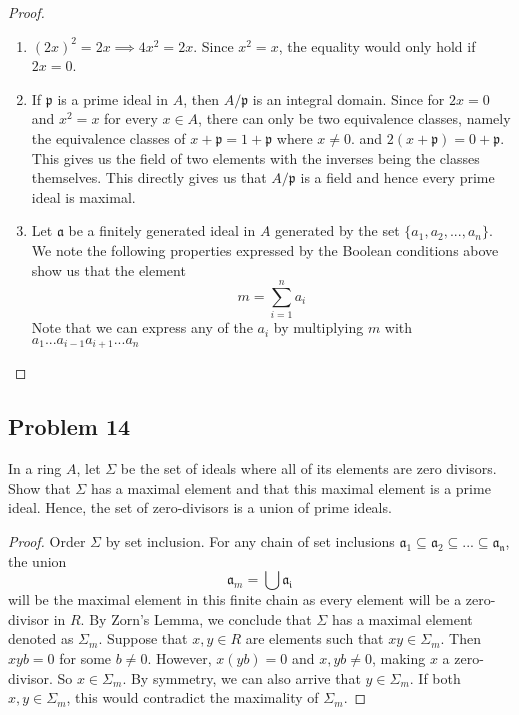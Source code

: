 \documentclass[12pt]{article}
\begin{document}
\begin{proof}
 \begin{enumerate}
  \item $(2x)^2 = 2x \implies 4x^2 = 2x$. Since $x^2 = x$, the equality would only hold if $2x = 0$.
  \item If $\mathfrak{p}$ is a prime ideal in $A$, then $A / \mathfrak{p}$ is an integral domain. Since for $2x = 0$ and $x^2 = x$ for every $x \in A$, there can only be two equivalence classes, namely the equivalence classes of $x + \mathfrak{p} = 1 + \mathfrak{p}$ where $x \neq 0$. and $2(x + \mathfrak{p})= 0 + \mathfrak{p}$. This gives us the field of two elements with the inverses being the classes themselves. This directly gives us that $A / \mathfrak{p}$ is a field and hence every prime ideal is maximal. 
  \item Let $\mathfrak{a}$ be a finitely generated ideal in $A$ generated by the set $\{a_1,a_2,...,a_n\}$. We note the following properties expressed by the Boolean conditions above show us that the element
  $$ m = \sum_{i=1}^n a_i $$ Note that we can express any of the $a_i$ by multiplying $m$ with $a_1...a_{i-1}a_{i+1}...a_n$

 \end{enumerate}

\end{proof}

\subsection{Problem 14}
In a ring $A$, let $\Sigma$ be the set of ideals where all of its elements are zero divisors. Show that $\Sigma$ has a maximal element and that this maximal element is a prime ideal. Hence, the set of zero-divisors is a union of prime ideals.

\begin{proof}
 Order $\Sigma$ by set inclusion. For any chain of set inclusions $\mathfrak{a_1} \subseteq \mathfrak{a_2} \subseteq ... \subseteq \mathfrak{a_n}$, the union 
$$ \mathfrak{a}_m = \bigcup \mathfrak{a_i} $$ will be the maximal element in this finite chain as every element will be a zero-divisor in $R$. By Zorn's Lemma, we conclude that $\Sigma$ has a maximal element denoted as $\Sigma_m$. Suppose that $x,y\in R$ are elements such that $xy \in \Sigma_m$.
Then $xyb = 0$ for some $b \neq 0$. However, $x(yb) = 0$ and $x,yb \neq 0$, making $x$ a zero-divisor. So $x \in \Sigma_m$. By symmetry, we can also arrive that $y \in \Sigma_m$. If both $x,y \in \Sigma_m$, this would contradict the maximality of $\Sigma_m$.
\end{proof}
\end{document}
